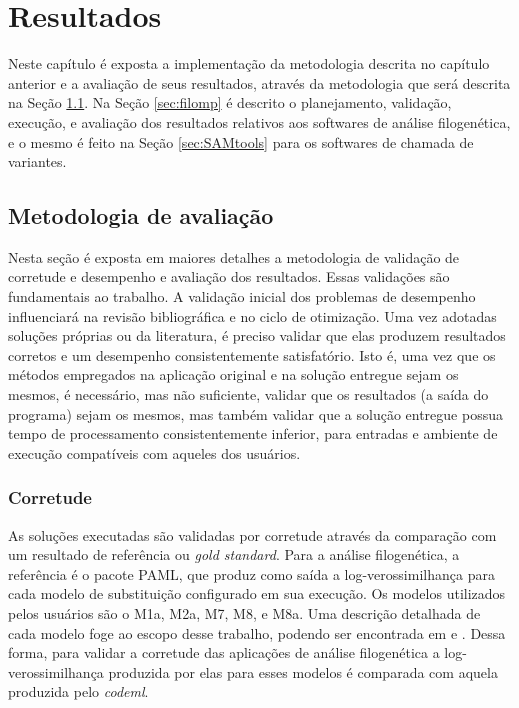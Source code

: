 \documentclass[cic,tc]{iiufrgs}
\begin{document}
%
%
%
%
\chapter{Resultados}
\label{chap:imp}

Neste capítulo é exposta a implementação da metodologia descrita no capítulo
anterior e a avaliação de seus resultados, através da metodologia que será
descrita na Seção \ref{sec:test}. Na Seção \ref{sec:filomp} é descrito o
planejamento, validação, execução, e avaliação dos resultados relativos aos
softwares de análise filogenética, e o mesmo é feito na Seção
\ref{sec:SAMtools} para os softwares de chamada de variantes.

\section{Metodologia de avaliação}
\label{sec:test}

Nesta seção é exposta em maiores detalhes a metodologia de validação de
corretude e desempenho e avaliação dos resultados. Essas validações são
fundamentais ao trabalho. A validação inicial dos problemas de desempenho
influenciará na revisão bibliográfica e no ciclo de otimização. Uma vez
adotadas soluções próprias ou da literatura, é preciso validar que elas
produzem resultados corretos e um desempenho consistentemente satisfatório.
Isto é, uma vez que os métodos empregados na aplicação original e na solução
entregue sejam os mesmos, é necessário, mas não suficiente, validar que os
resultados (a saída do programa) sejam os mesmos, mas também validar que a
solução entregue possua tempo de processamento consistentemente inferior, para
entradas e ambiente de execução compatíveis com aqueles dos usuários.

\subsection{Corretude}

As soluções executadas são validadas por corretude através da comparação com um
resultado de referência ou \textit{gold standard}. Para a análise filogenética,
a referência é o pacote PAML, que produz como saída a log-verossimilhança para
cada modelo de substituição configurado em sua execução. Os modelos utilizados
pelos usuários são o M1a, M2a, M7, M8, e M8a. Uma descrição detalhada de cada
modelo foge ao escopo desse trabalho, podendo ser encontrada em
\cite{yang2000codon} e \cite{zhang2005evaluation}. Dessa forma, para validar a
corretude das aplicações de análise filogenética a log-verossimilhança
produzida por elas para esses modelos é comparada com aquela produzida pelo
\textit{codeml}.
\end{document}
